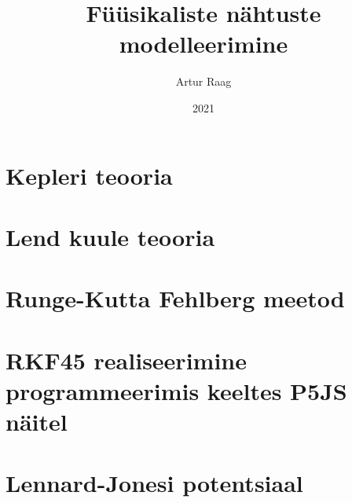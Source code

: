 \documentclass[a4paper, oneside]{book}
\begin{document}
\title{Füüsikaliste nähtuste modelleerimine}
\author{Artur Raag}
\date{2021}
\maketitle

\thispagestyle{empty}
\tableofcontents
\newpage
\thispagestyle{empty}

%

\chapter{Kepleri teooria}



\chapter{Lend kuule teooria}


\chapter{Runge-Kutta Fehlberg meetod}


\chapter{RKF45 realiseerimine programmeerimis keeltes P5JS näitel}


\chapter{Lennard-Jonesi potentsiaal}


\pagebreak
%
%
\end{document}
